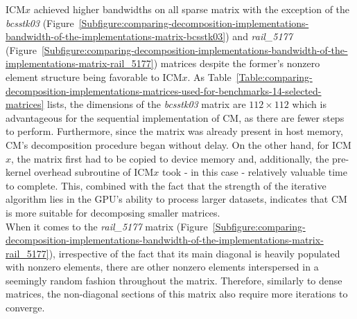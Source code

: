 \par ICM$ x $ achieved higher bandwidths on all sparse matrix with the exception of the \textit{bcsstk03} (Figure~\ref{Subfigure:comparing-decomposition-implementations-bandwidth-of-the-implementations-matrix-bcsstk03}) and \textit{rail\_5177} (Figure~\ref{Subfigure:comparing-decomposition-implementations-bandwidth-of-the-implementations-matrix-rail_5177}) matrices despite the former's nonzero element structure being favorable to ICM$ x $. As Table~\ref{Table:comparing-decomposition-implementations-matrices-used-for-benchmarks-14-selected-matrices} lists, the dimensions of the \textit{bcsstk03} matrix are $ 112\times 112 $ which is advantageous for the sequential implementation of CM, as there are fewer steps to perform. Furthermore, since the matrix was already present in host memory, CM's decomposition procedure began without delay. On the other hand, for ICM$ x $, the matrix first had to be copied to device memory and, additionally, the pre-kernel overhead subroutine of ICM$ x $ took - in this case - relatively valuable time to complete. This, combined with the fact that the strength of the iterative algorithm lies in the GPU's ability to process larger datasets, indicates that CM is more suitable for decomposing smaller matrices. \\
When it comes to the \textit{rail\_5177} matrix (Figure~\ref{Subfigure:comparing-decomposition-implementations-bandwidth-of-the-implementations-matrix-rail_5177}), irrespective of the fact that its main diagonal is heavily populated with nonzero elements, there are other nonzero elements interspersed in a seemingly random fashion throughout the matrix. Therefore, similarly to dense matrices, the non-diagonal sections of this matrix also require more iterations to converge.

